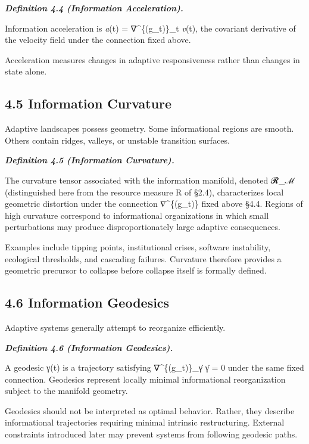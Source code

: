 \documentclass[
]{article}
\begin{document}
\emph{\textbf{Definition 4.4 (Information Acceleration).}}

Information acceleration is \emph{a}(t) = ∇\^{}\{(g\_t)\}\_t
\emph{v}(t), the covariant derivative of the velocity field under the
connection fixed above.

Acceleration measures changes in adaptive responsiveness rather than
changes in state alone.

\hypertarget{information-curvature}{%
\subsection{4.5 Information Curvature}\label{information-curvature}}

Adaptive landscapes possess geometry. Some informational regions are
smooth. Others contain ridges, valleys, or unstable transition surfaces.

\emph{\textbf{Definition 4.5 (Information Curvature).}}

The curvature tensor associated with the information manifold, denoted
𝓡\_ℳ (distinguished here from the resource measure R of §2.4),
characterizes local geometric distortion under the connection
∇\^{}\{(g\_t)\} fixed above §4.4. Regions of high curvature correspond
to informational organizations in which small perturbations may produce
disproportionately large adaptive consequences.

Examples include tipping points, institutional crises, software
instability, ecological thresholds, and cascading failures. Curvature
therefore provides a geometric precursor to collapse before collapse
itself is formally defined.

\hypertarget{information-geodesics}{%
\subsection{4.6 Information Geodesics}\label{information-geodesics}}

Adaptive systems generally attempt to reorganize efficiently.

\emph{\textbf{Definition 4.6 (Information Geodesics).}}

A geodesic γ(t) is a trajectory satisfying ∇\^{}\{(g\_t)\}\_γ̇ γ̇ = 0
under the same fixed connection. Geodesics represent locally minimal
informational reorganization subject to the manifold geometry.

Geodesics should not be interpreted as optimal behavior. Rather, they
describe informational trajectories requiring minimal intrinsic
restructuring. External constraints introduced later may prevent systems
from following geodesic paths.
\end{document}
